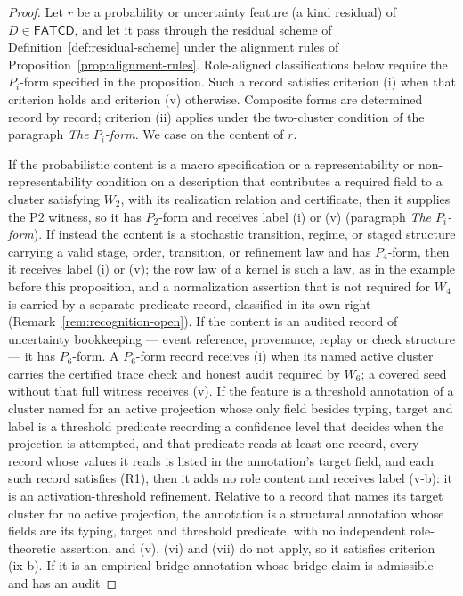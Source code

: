 \documentclass[11pt]{article}
\theoremstyle{definition}
\newcommand{\FATCD}{\ensuremath{\mathsf{FATCD}}}
\newcommand{\Ptwo}{\ensuremath{\mathrm{P2}}}
\begin{document}
\begin{proof}
Let \(r\) be a probability or uncertainty feature (a kind residual) of
\(D \in \FATCD{}\), and let it pass through the residual scheme of
Definition~\ref{def:residual-scheme} under the alignment rules of
Proposition~\ref{prop:alignment-rules}. Role-aligned classifications below require the \(P_i\)-form specified in the
proposition. Such a record satisfies criterion (i) when that criterion holds and
criterion (v) otherwise. Composite forms are determined record by record;
criterion (ii) applies under the two-cluster condition of the paragraph
\emph{The \(P_i\)-form}. We case on the content of \(r\).

If the probabilistic content is a macro specification or a
representability or non-representability condition on a description that
contributes a required field to a cluster satisfying \(W_2\), with its
realization relation and certificate, then it supplies the \Ptwo{}
witness, so it has \(P_2\)-form and receives label (i) or (v) (paragraph
\emph{The \(P_i\)-form}). If instead the content is a stochastic transition,
regime, or staged structure carrying a valid stage, order, transition,
or refinement law and has \(P_4\)-form, then it receives label (i) or (v); the
row law of a kernel is such a law, as in the example before this proposition,
and a normalization assertion that is not required for \(W_4\) is carried by a
separate predicate record, classified in its own right
(Remark~\ref{rem:recognition-open}). If the content is an audited record of uncertainty
bookkeeping --- event reference, provenance, replay or check structure
--- it has \(P_6\)-form. A \(P_6\)-form record receives (i) when its named
active cluster carries the certified trace check and honest audit required by
\(W_6\); a covered seed without that full witness receives (v). If the
feature is a threshold annotation of a cluster named for an active projection
whose only field besides typing, target and label is a threshold predicate recording a confidence level
that decides when the projection is attempted, and that predicate reads at least one record, every record whose values it reads is listed in the annotation's target field, and each such record satisfies (R1), then it adds no role content and receives
label (v-b): it is an activation-threshold
refinement. Relative to a record that names its target cluster for no active projection,
the annotation is a structural annotation whose fields are its typing, target
and threshold predicate, with no independent role-theoretic assertion, and
(v), (vi) and (vii) do not apply, so it satisfies criterion (ix-b). If it is an empirical-bridge annotation whose bridge claim is admissible and has an audit

\end{proof}
\end{document}
